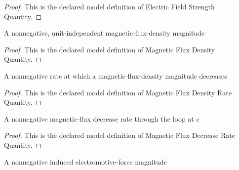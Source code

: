 \begin{proof}
  This is the declared model definition of Electric Field Strength Quantity.
\end{proof}
\begin{definition}
  \label{def:physics:phyx-mini-0927:phyxminiproblems-problemphyxmini0927-magneticfluxdensityquantity}
  A nonnegative, unit-independent magnetic-flux-density magnitude
\end{definition}
\begin{proof}
  This is the declared model definition of Magnetic Flux Density Quantity.
\end{proof}
\begin{definition}
  \label{def:physics:phyx-mini-0927:phyxminiproblems-problemphyxmini0927-magneticfluxdensityratequantity}
  A nonnegative rate at which a magnetic-flux-density magnitude decreases
\end{definition}
\begin{proof}
  This is the declared model definition of Magnetic Flux Density Rate Quantity.
\end{proof}
\begin{definition}
  \label{def:physics:phyx-mini-0927:phyxminiproblems-problemphyxmini0927-magneticfluxdecreaseratequantity}
  A nonnegative magnetic-flux decrease rate through the loop at c
\end{definition}
\begin{proof}
  This is the declared model definition of Magnetic Flux Decrease Rate Quantity.
\end{proof}
\begin{definition}
  \label{def:physics:phyx-mini-0927:phyxminiproblems-problemphyxmini0927-inducedemfmagnitudequantity}
  A nonnegative induced electromotive-force magnitude
\end{definition}
